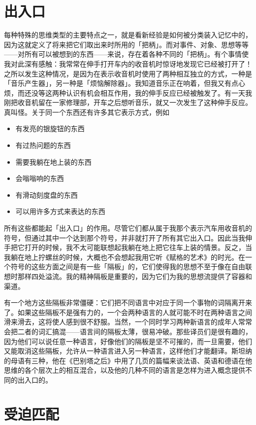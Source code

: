 \documentclass[
  12pt,
  twoside,
  openright,
  oldfontcommands,
]{memoir}
\providecommand{\tightlist}{%
  \setlength{\itemsep}{0pt}\setlength{\parskip}{0pt}}
\begin{document}
\section{出入口}

每种特殊的思维类型的主要特点之一，就是看新经验是如何被分类装入记忆中的，因为这就定义了将来把它们取出来时所用的「把柄」。而对事件、对象、思想等等------对所有可以被想到的东西------来说，存在着各种不同的「把柄」。有个事情使我对此深有感触：我常常在伸手打开车内的收音机时惊讶地发现它已经被打开了！之所以发生这种情况，是因为在表示收音机时使用了两种相互独立的方式，一种是「音乐产生器」，另一种是「烦恼解除器」。我知道音乐正在响着，但我又有点心烦，而还没等这两种认识有机会相互作用，我的伸手反应已经被触发了。有一天我刚把收音机留在一家修理部，开车之后想听音乐，就又一次发生了这种伸手反应。真叫怪。关于同一个东西还有许多其它表示方式，例如

\begin{itemize}
\tightlist
\item
  有发亮的银旋钮的东西
\item
  有过热问题的东西
\item
  需要我躺在地上装的东西
\item
  会嗡嗡响的东西
\item
  有滑动刻度盘的东西
\item
  可以用许多方式来表达的东西
\end{itemize}

所有这些都能起「出入口」的作用。尽管它们都从属于我那个表示汽车用收音机的符号，但通过其中一个达到那个符号，并非就打开了所有其它出入口。因此当我伸手把它打开的时候，我不太可能联想起我躺在地上把它往车上装的情景。反之，当我躺在地上拧螺丝的时候，大概也不会想起我用它听《赋格的艺术》的时光。在一个符号的这些方面之间是有一些「隔板」的，它们使得我的思想不至于像在自由联想时那样四处溢流。我的精神隔板是重要的，因为它们为我的思想流提供了容器和渠道。

有一个地方这些隔板非常僵硬：它们把不同语言中对应于同一个事物的词隔离开来了。如果这些隔板不是强有力的，一个会两种语言的人就可能不时在两种语言之间滑来滑去，这将使人感到很不舒服。当然，一个同时学习两种新语言的成年人常常会把二者的词汇搞混------语言间的隔板太薄，很易冲破。那些译员们是很有趣的，因为他们可以说任意一种语言，好像他们的隔板是坚不可摧的，而一旦需要，他们又能取消这些隔板，允许从一种语言进入另一种语言，这样他们才能翻译。斯坦纳的母语有三种，他在《巴别塔之后》中用了几页的篇幅来谈法语、英语和德语在他思维的各个层次上的相互混合，以及他的几种不同的语言是怎样为进入概念提供不同的出入口的。

\section{受迫匹配}
\end{document}
